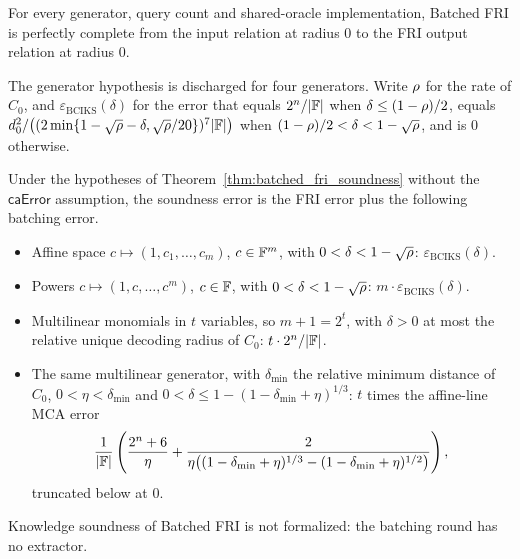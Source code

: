 \begin{theorem}\label{thm:batched_fri_completeness}
\leanok
{}
For every generator, query count and shared-oracle implementation, Batched FRI is
perfectly complete from the input relation at radius $0$ to the FRI output
relation at radius $0$.
\end{theorem}

The generator hypothesis is discharged for four generators. Write
$\rho$ for the rate of $C_0$, and $\varepsilon_{\mathrm{BCIKS}}(\delta)$ for the
error that equals $2^n/|\mathbb{F}|$ when $\delta\leq(1-\rho)/2$, equals
$d_0^2/\bigl((2\min\{1-\sqrt{\rho}-\delta,\sqrt{\rho}/20\})^7|\mathbb{F}|\bigr)$ when
$(1-\rho)/2<\delta<1-\sqrt{\rho}$, and is $0$ otherwise.

\begin{theorem}\label{thm:batched_fri_generators}
\leanok
{}
Under the hypotheses of Theorem~\ref{thm:batched_fri_soundness} without the
$\mathsf{caError}$ assumption, the soundness error is the FRI error plus the
following batching error.
\begin{itemize}
  \item Affine space $c\mapsto(1,c_1,\ldots,c_m)$, $c\in\mathbb{F}^m$, with
    $0<\delta<1-\sqrt{\rho}$: $\varepsilon_{\mathrm{BCIKS}}(\delta)$.
  \item Powers $c\mapsto(1,c,\ldots,c^m)$, $c\in\mathbb{F}$, with
    $0<\delta<1-\sqrt{\rho}$: $m\cdot\varepsilon_{\mathrm{BCIKS}}(\delta)$.
  \item Multilinear monomials in $t$ variables, so $m+1=2^t$, with $\delta>0$
    at most the relative unique decoding radius of $C_0$:
    $t\cdot 2^n/|\mathbb{F}|$.
  \item The same multilinear generator, with $\delta_{\min}$ the relative minimum
    distance of $C_0$, $0<\eta<\delta_{\min}$ and
    $0<\delta\leq 1-(1-\delta_{\min}+\eta)^{1/3}$: $t$ times the affine-line
    MCA error
    \[
      \frac{1}{|\mathbb{F}|}\left(\frac{2^n+6}{\eta}
      +\frac{2}{\eta\bigl((1-\delta_{\min}+\eta)^{1/3}
      -(1-\delta_{\min}+\eta)^{1/2}\bigr)}\right),
    \]
    truncated below at $0$.
\end{itemize}
\end{theorem}

Knowledge soundness of Batched FRI is not formalized: the batching round has no
extractor.

